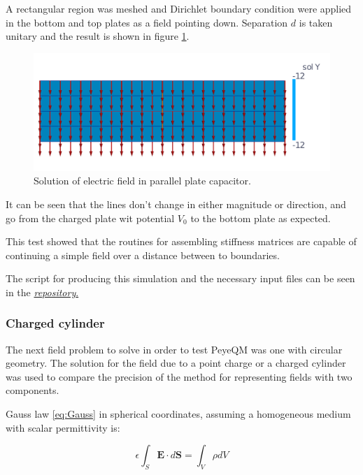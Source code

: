 A rectangular region was meshed and Dirichlet boundary condition were applied in the bottom and top plates as a field pointing down. Separation $d$ is taken unitary and the result is shown in figure \ref{fig:capacitor}.

\begin{figure}
\centering
\includegraphics[scale=0.3]{./img/capacitor.pdf}
\caption{Solution of electric field in parallel plate capacitor.}
\label{fig:capacitor}
\end{figure}

It can be seen that the lines don't change in either magnitude or direction, and go from the charged plate wit potential $V_0$ to the bottom plate as expected.

This test showed that the routines for assembling stiffness matrices are capable of continuing a simple field over a distance between to boundaries.

The script for producing this simulation and the necessary input files can be seen in the 
\href{https://github.com/bebopsan/peyeQM/tree/Depuration/Lib/OOPyQM/Examples/Capacitor}{\textit{repository}.}

\subsubsection{Charged cylinder}

The next field problem to solve in order to test PeyeQM was one with circular geometry. The solution for the field due to a point charge or a charged cylinder was used to compare the precision of the method for representing fields with two components.

Gauss law \ref{eq:Gauss} in spherical coordinates, assuming a homogeneous medium with scalar permittivity is:

\begin{equation}
\epsilon \int_S \mathbf{E}\cdot d\mathbf{S} = \int_V \rho dV
\end{equation}

